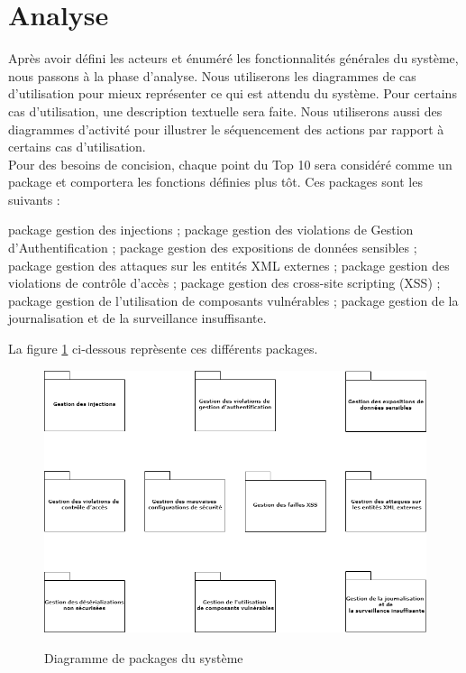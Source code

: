 \section{Analyse}
Après avoir défini les acteurs et énuméré les fonctionnalités générales du système, nous passons à la phase d'analyse. Nous utiliserons les diagrammes de cas d'utilisation pour mieux représenter ce qui est attendu du système. Pour certains cas d'utilisation, une description textuelle sera faite. Nous utiliserons aussi des diagrammes d'activité pour illustrer le séquencement des actions par rapport à certains cas d'utilisation.\\
Pour des besoins de concision, chaque point du Top 10 sera considéré comme un package et comportera les fonctions définies plus tôt. Ces packages sont les suivants :
\begin{itemize}
	\itemtirait package gestion des injections ;
	\itemtirait package gestion des violations de Gestion d’Authentification ;
	\itemtirait package gestion des expositions de données sensibles ;
	\itemtirait package gestion des attaques sur les entités XML externes ;
	\itemtirait package gestion des violations de contrôle d’accès ;
	\itemtirait package gestion des cross-site scripting (XSS) ;
	\itemtirait package gestion de l'utilisation de composants vulnérables ;
	\itemtirait package gestion de la journalisation et de la surveillance insuffisante.
\end{itemize}
La figure \ref{fig:8.1} ci-dessous reprèsente ces différents packages.
\begin{figure}[h!]
	\centering
	\begin{minipage}{18cm}
		\centering
		{\includegraphics[height=0.27\textheight]{fig/Package-Diagram.png}}
	\end{minipage}
	\caption{Diagramme de packages du système}
	\label{fig:8.1}
\end{figure}

